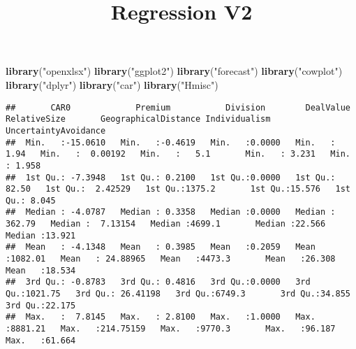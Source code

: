 \documentclass[]{article}
\title{Regression V2}
\author{}
\date{}
\newenvironment{Shaded}{\begin{snugshade}}{\end{snugshade}}
\newcommand{\KeywordTok}[1]{\textcolor[rgb]{0.13,0.29,0.53}{\textbf{#1}}}
\newcommand{\StringTok}[1]{\textcolor[rgb]{0.31,0.60,0.02}{#1}}
\newcommand{\NormalTok}[1]{#1}
\begin{document}
\maketitle

\begin{Shaded}
\begin{Highlighting}[]
\KeywordTok{library}\NormalTok{(}\StringTok{"openxlsx"}\NormalTok{)}
\KeywordTok{library}\NormalTok{(}\StringTok{"ggplot2"}\NormalTok{)}
\KeywordTok{library}\NormalTok{(}\StringTok{"forecast"}\NormalTok{)}
\KeywordTok{library}\NormalTok{(}\StringTok{"cowplot"}\NormalTok{)}
\KeywordTok{library}\NormalTok{(}\StringTok{"dplyr"}\NormalTok{)}
\KeywordTok{library}\NormalTok{(}\StringTok{"car"}\NormalTok{)}
\KeywordTok{library}\NormalTok{(}\StringTok{"Hmisc"}\NormalTok{)}
\end{Highlighting}
\end{Shaded}

\begin{verbatim}
##       CAR0             Premium           Division        DealValue        RelativeSize       GeographicalDistance Individualism    UncertaintyAvoidance
##  Min.   :-15.0610   Min.   :-0.4619   Min.   :0.0000   Min.   :   1.94   Min.   :  0.00192   Min.   :   5.1       Min.   : 3.231   Min.   : 1.958      
##  1st Qu.: -7.3948   1st Qu.: 0.2100   1st Qu.:0.0000   1st Qu.:  82.50   1st Qu.:  2.42529   1st Qu.:1375.2       1st Qu.:15.576   1st Qu.: 8.045      
##  Median : -4.0787   Median : 0.3358   Median :0.0000   Median : 362.79   Median :  7.13154   Median :4699.1       Median :22.566   Median :13.921      
##  Mean   : -4.1348   Mean   : 0.3985   Mean   :0.2059   Mean   :1082.01   Mean   : 24.88965   Mean   :4473.3       Mean   :26.308   Mean   :18.534      
##  3rd Qu.: -0.8783   3rd Qu.: 0.4816   3rd Qu.:0.0000   3rd Qu.:1021.75   3rd Qu.: 26.41198   3rd Qu.:6749.3       3rd Qu.:34.855   3rd Qu.:22.175      
##  Max.   :  7.8145   Max.   : 2.8100   Max.   :1.0000   Max.   :8881.21   Max.   :214.75159   Max.   :9770.3       Max.   :96.187   Max.   :61.664
\end{verbatim}
\end{document}
